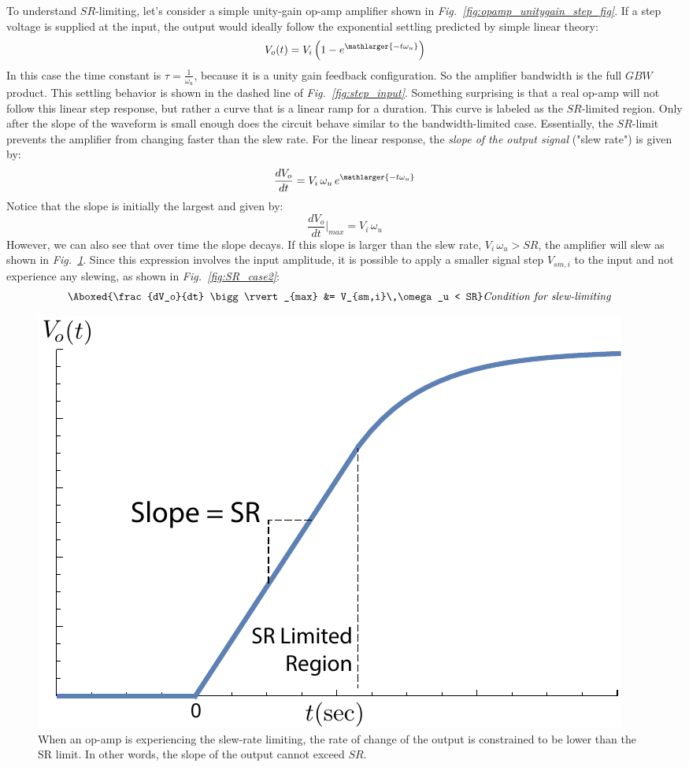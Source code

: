 To understand $SR$-limiting, let's consider a simple unity-gain op-amp amplifier shown in \emph{Fig.~\ref{fig:opamp_unitygain_step_fig}}.  If a step voltage is supplied at the input, the output would ideally follow the exponential settling predicted by simple linear theory:
    \begin{equation}
        V_o(t) = V_i \left(1 - e^{\mathlarger{-t \omega_u}}\right) 
    \end{equation}
In this case the time constant is $\tau = \frac{1}{\omega_u}$, because it is a unity gain feedback configuration.  So the amplifier bandwidth is the full $GBW$ product.  This settling behavior is shown in the dashed line of \emph{Fig.~\ref{fig:step_input}}.  Something surprising is that a real op-amp will not follow this linear step response, but rather a curve that is a linear ramp for a duration.  This curve is labeled as the $SR$-limited region.  Only after the slope of the waveform is small enough does the circuit behave similar to the bandwidth-limited case.  Essentially, the $SR$-limit prevents the amplifier from changing faster than the slew rate.  For the linear response, the \textit{slope of the output signal} ("slew rate") is given by:
    \begin{equation}
        \frac{dV_o}{dt} = V_i\,\omega_u\,e^{\mathlarger{-t \omega_u}}
    \end{equation}
Notice that the slope is initially the largest and given by:
    \begin{equation}
        \frac{dV_o}{dt} \bigg\rvert_{max} = V_i\,\omega_u
    \end{equation}
However, we can also see that over time the slope decays. If this slope is larger than the slew rate, $V_i\,\omega_u > SR$, the amplifier will slew as shown in \emph{Fig.~\ref{fig:SR_case1}}.  Since this expression involves the input amplitude, it is possible to apply a smaller signal step $V_{sm,i}$ to the input and not experience any slewing, as shown in \emph{Fig.~\ref{fig:SR_case2}}:  
    \begin{align}
        \Aboxed{\frac{dV_o}{dt} \bigg\rvert_{max} &= V_{sm,i}\,\omega_u  < SR}
        &\textit{Condition for slew-limiting}
        \label{eq:slew_limiting}
    \end{align}
\begin{figure}[H]
\centering
\includegraphics[width=.55\columnwidth]{SR_case1}
\caption{When an op-amp is experiencing the slew-rate limiting, the rate of change of the output is constrained to be lower than the SR limit.  In other words, the slope of the output cannot exceed $SR$.} \label{fig:SR_case1}
\end{figure} 
